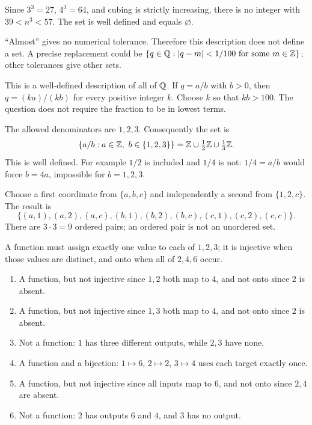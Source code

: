 
Since $3^3=27$, $4^3=64$, and cubing is strictly increasing, there is no integer with $39<n^3<57$. The set is well defined and equals $\varnothing$.


``Almost'' gives no numerical tolerance. Therefore this description does not define a set. A precise replacement could be $\{q\in\mathbb{Q}:|q-m|<1/100\text{ for some }m\in\mathbb{Z}\}$; other tolerances give other sets.


This is a well-defined description of all of $\mathbb{Q}$. If $q=a/b$ with $b>0$, then $q=(ka)/(kb)$ for every positive integer $k$. Choose $k$ so that $kb>100$. The question does not require the fraction to be in lowest terms.


The allowed denominators are $1,2,3$. Consequently the set is
\[\{a/b:a\in\Z,\ b\in\{1,2,3\}\}=\Z\cup\tfrac12\Z\cup\tfrac13\Z.
\]
This is well defined. For example $1/2$ is included and $1/4$ is not: $1/4=a/b$ would force $b=4a$, impossible for $b=1,2,3$.


Choose a first coordinate from $\{a,b,c\}$ and independently a second from $\{1,2,c\}$. The result is
\[\{(a,1),(a,2),(a,c),(b,1),(b,2),(b,c),(c,1),(c,2),(c,c)\}.\]
There are $3\cdot3=9$ ordered pairs; an ordered pair is not an unordered set.


A function must assign exactly one value to each of $1,2,3$; it is injective when those values are distinct, and onto when all of $2,4,6$ occur.
\begin{enumerate}[label=(\alph*)]
\item A function, but not injective since $1,2$ both map to $4$, and not onto since $2$ is absent.
\item A function, but not injective since $1,3$ both map to $4$, and not onto since $2$ is absent.
\item Not a function: $1$ has three different outputs, while $2,3$ have none.
\item A function and a bijection: $1\mapsto6$, $2\mapsto2$, $3\mapsto4$ uses each target exactly once.
\item A function, but not injective since all inputs map to $6$, and not onto since $2,4$ are absent.
\item Not a function: $2$ has outputs $6$ and $4$, and $3$ has no output.
\end{enumerate}

